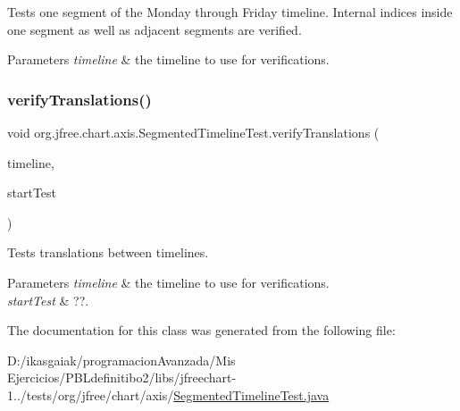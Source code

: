Tests one segment of the Monday through Friday timeline. Internal indices inside one segment as well as adjacent segments are verified. 
\begin{DoxyParams}{Parameters}
{\em timeline} & the timeline to use for verifications. \\
\hline
\end{DoxyParams}
\mbox{\label{classorg_1_1jfree_1_1chart_1_1axis_1_1_segmented_timeline_test_ae041ea6c1b16ef5ae52793fea92bccec}} 
\subsubsection{\texorpdfstring{verify\+Translations()}{verifyTranslations()}}
{\footnotesize\ttfamily void org.\+jfree.\+chart.\+axis.\+Segmented\+Timeline\+Test.\+verify\+Translations (\begin{DoxyParamCaption}\item[{\mbox{\hyperlink{classorg_1_1jfree_1_1chart_1_1axis_1_1_segmented_timeline}{Segmented\+Timeline}}}]{timeline,  }\item[{long}]{start\+Test }\end{DoxyParamCaption})}

Tests translations between timelines.


\begin{DoxyParams}{Parameters}
{\em timeline} & the timeline to use for verifications. \\
\hline
{\em start\+Test} & ??. \\
\hline
\end{DoxyParams}


The documentation for this class was generated from the following file\+:\begin{DoxyCompactItemize}
\item 
D\+:/ikasgaiak/programacion\+Avanzada/\+Mis Ejercicios/\+P\+B\+Ldefinitibo2/libs/jfreechart-\/1../tests/org/jfree/chart/axis/\mbox{\hyperlink{_segmented_timeline_test_8java}{Segmented\+Timeline\+Test.\+java}}\end{DoxyCompactItemize}
